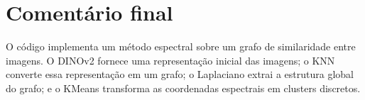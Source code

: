 \documentclass[11pt,a4paper]{article}
\begin{document}
\section{Comentário final}

O código implementa um método espectral sobre um grafo de similaridade entre
imagens. O DINOv2 fornece uma representação inicial das imagens; o KNN converte
essa representação em um grafo; o Laplaciano extrai a estrutura global do grafo;
e o KMeans transforma as coordenadas espectrais em clusters discretos.
\end{document}
